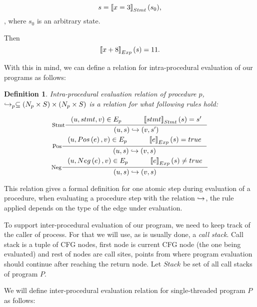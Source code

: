 \documentclass[..thesis.tex]{subfiles}
\newtheorem{defin}{Definition}[section]
\begin{document}
\begin{equation*}
s = \left\llbracket x = 3 \right\rrbracket_{Stmt} (s_0) \text{,}
\end{equation*},
where $s_0$ is an arbitrary state. 

Then 
\begin{equation*}
\left\llbracket x + 8 \right\rrbracket_{Exp} \left( s \right) = 11 \text{.}    
\end{equation*}

With this in mind, we can define a relation for intra-procedural evaluation of our programs as follows:

\begin{defin}
Intra-procedural evaluation relation of procedure $p$, $\hookrightarrow_p \subseteq  \left( N_p  \times S \right)  \times \left( N_p \times S \right)$
is a relation for what following rules hold:

\addtolength{\jot}{2em}
\begin{gather*}
  \inference[Stmt]{ \lp u, stmt, v \rp \in E_{p}  \separ  \lllb stmt \rrrb_{Stmt} \lp s \rp = s'}{\lp u, s \rp \intraproc \lp v, s' \rp} \\
  \inference[Pos]{ \lp u, Pos \lp e \rp , v \rp \in E_{p} \separ \lllb e \rrrb_{Exp} \lp s \rp = true }{\lp u, s \rp \intraproc \lp v, s \rp} \\  
  \inference[Neg]{ \lp u, Neg \lp e \rp , v \rp \in E_{p} \separ \lllb e \rrrb_{Exp} \lp s \rp \neq true }{\lp u, s \rp \intraproc \lp v, s \rp} 
\end{gather*}
\addtolength{\jot}{-2em}

\end{defin}

This relation gives a formal definition for one atomic step during evaluation of a procedure, when evaluating a procedure step with the relation $\hookrightarrow$,
the rule applied depends on the type of the edge under evaluation. 


To support inter-procedural evaluation of our program, we need to keep track of the caller of process. For that we will use, as is usually done, a \textit{call stack}.
Call stack is a tuple of CFG nodes, first node is current CFG node (the one being evaluated) and rest of nodes are call sites, points from where program evaluation
 should continue after reaching the return node. Let $Stack$ be set of all call stacks of program $P$. 

We will define inter-procedural evaluation relation for single-threaded program $P$ as follows:
\end{document}

